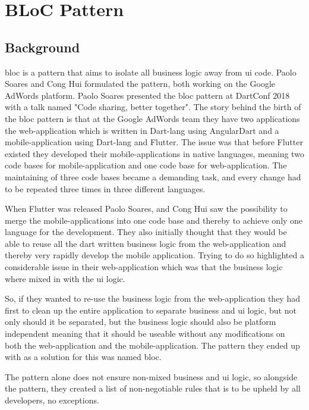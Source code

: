 \section{BLoC Pattern}

\subsection{Background}
\gls{bloc} is a pattern that aims to isolate all business logic away from \gls{ui} code. Paolo Soares and Cong Hui formulated the pattern, both working on the Google AdWords platform. Paolo Soares presented the \gls{bloc} pattern at DartConf 2018 with a talk named "Code sharing, better together". The story behind the birth of the \gls{bloc} pattern is that at the Google AdWords team they have two applications the web-application which is written in Dart-lang using AngularDart and a mobile-application using Dart-lang and Flutter. The issue was that before Flutter existed they developed their mobile-applications in native languages, meaning two code bases for mobile-application and one code base for web-application. The maintaining of three code bases became a demanding task, and every change had to be repeated three times in three different languages.

When Flutter was released Paolo Soares, and Cong Hui saw the possibility to merge the mobile-applications into one code base and thereby to achieve only one language for the development. They also initially thought that they would be able to reuse all the dart written business logic from the web-application and thereby very rapidly develop the mobile application. Trying to do so highlighted a considerable issue in their web-application which was that the business logic where mixed in with the \gls{ui} logic.

So, if they wanted to re-use the business logic from the web-application they had first to clean up the entire application to separate business and \gls{ui} logic, but not only should it be separated, but the business logic should also be platform independent meaning that it should be useable without any modifications on both the web-application and the mobile-application. The pattern they ended up with as a solution for this was named \gls{bloc}.

The pattern alone does not ensure non-mixed business and \gls{ui} logic, so alongside the pattern, they created a list of non-negotiable rules that is to be upheld by all developers, no exceptions.

